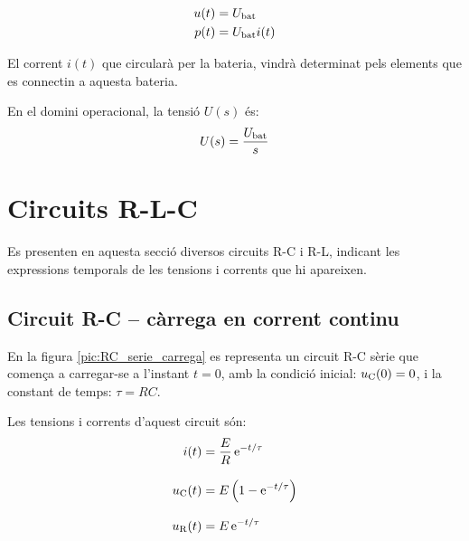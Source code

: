 \hfill
\begin{minipage}[b]{5cm}
    
    \label{pic:bat}
\end{minipage}
\hfill
\begin{minipage}[b][3cm][t]{8cm}
   \begin{align}
      u(t) &= U_\mathrm{bat} \\  p(t) &= U_\mathrm{bat} i(t)
   \end{align}
\end{minipage}


El corrent $i(t)$ que circular\`{a} per la bateria, vindr\`{a} determinat
pels elements que es connectin a aquesta bateria.

 En el domini operacional, la
tensi\'{o} $U(s)$ \'{e}s:
\begin{equation}
   U(s) = \frac{U_\mathrm{bat}}{s}
\end{equation}


\section{Circuits R-L-C}

Es presenten en aquesta secci\'{o} diversos circuits R-C i R-L, indicant les expressions temporals de les tensions i corrents que hi apareixen.

\subsection{Circuit R-C -- c\`{a}rrega en corrent continu}

En la figura \vref{pic:RC_serie_carrega} es representa un circuit R-C s\`{e}rie que comen\c{c}a a carregar-se a l'instant $t=0$, amb la condici\'{o} inicial: $u_\mathrm{C}(0) = 0$, i la constant de temps: $\tau = R C$.
\begin{center}
    
    \label{pic:RC_serie_carrega}
\end{center}

Les tensions i corrents d'aquest circuit s\'{o}n:
\begin{align}
    i(t) &= \frac{E}{R}\,\mathrm{e}^{-t/\tau} \\[3mm]
    u_\mathrm{C}(t) &= E \left( 1 - \mathrm{e}^{-t/\tau} \right) \\[3mm]
    u_\mathrm{R}(t) &= E\,\mathrm{e}^{-t/\tau}
\end{align}

